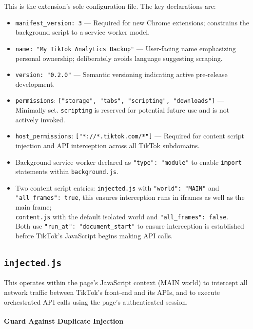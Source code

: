 This is the extension's sole configuration file. The key declarations are:
\begin{itemize}
    \item \verb|manifest_version: 3| — Required for new Chrome extensions; constrains the background script to a service worker model.
    \item \verb|name: "My TikTok Analytics Backup"| — User-facing name emphasizing personal ownership; deliberately avoids language suggesting scraping.
    \item \verb|version: "0.2.0"| — Semantic versioning indicating active pre-release development.
    \item \verb|permissions|: \verb|["storage", "tabs", "scripting", "downloads"]| — Minimally set. \verb|scripting| is reserved for potential future use and is not actively invoked.
    \item \verb|host_permissions|: \verb|["*://*.tiktok.com/*"]| — Required for content script injection and API interception across all TikTok subdomains.
    \item Background service worker declared as \verb|"type": "module"| to enable \verb|import| statements within \verb|background.js|.
    \item Two content script entries: \verb|injected.js| with \verb|"world": "MAIN"| and \\\verb|"all_frames": true|, this ensures interception runs in iframes as well as the main frame; \\\verb|content.js| with the default isolated world and \verb|"all_frames": false|. \\Both use \verb|"run_at": "document_start"| to ensure interception is established before TikTok's JavaScript begins making API calls.
\end{itemize}

\subsection{\texttt{injected.js}}

This operates within the page's JavaScript context (MAIN world) to intercept all network traffic between TikTok's front-end and its APIs, and to execute orchestrated API calls using the page's authenticated session.

\paragraph{\textbf{Guard Against Duplicate Injection}}

